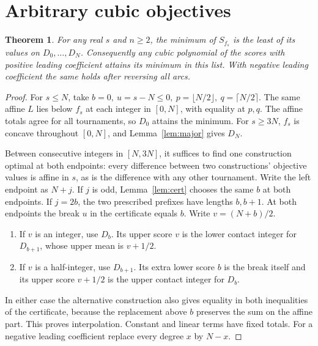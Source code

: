 \documentclass[11pt]{article}
\newtheorem{theorem}{Theorem}
\newcommand{\fl}[1]{\lfloor #1\rfloor}
\newcommand{\ce}[1]{\lceil #1\rceil}
\begin{document}
\newpage
\section*{Arbitrary cubic objectives}
\begin{theorem}
For any real \(s\) and \(n\ge2\), the minimum of \(S_{f_s}\) is the
least of its values on \(D_0,\ldots,D_N\). Consequently any cubic
polynomial of the scores with positive leading coefficient attains its
minimum in this list. With negative leading coefficient the same holds
after reversing all arcs.
\end{theorem}
\begin{proof}
For \(s\le N\), take \(b=0,\ u=s-N\le0,\ p=\fl{N/2},\
q=\ce{N/2}\). The same affine \(L\) lies below \(f_s\) at each integer
in \([0,N]\), with equality at \(p,q\). The affine totals agree for all
tournaments, so \(D_0\) attains the minimum. For \(s\ge3N\), \(f_s\) is
concave throughout \([0,N]\), and Lemma~\ref{lem:major} gives \(D_N\).

Between consecutive integers in \([N,3N]\), it suffices to find one
construction optimal at both endpoints: every difference between two
constructions' objective values is affine in \(s\), as is the difference
with any other tournament. Write the left endpoint as \(N+j\). If \(j\)
is odd, Lemma~\ref{lem:cert} chooses the same \(b\) at both endpoints.
If \(j=2b\), the two prescribed prefixes have lengths \(b,b+1\).
At both endpoints the break \(u\) in the certificate equals \(b\).
Write \(v=(N+b)/2\).
\begin{enumerate}
\item If \(v\) is an integer, use \(D_b\). Its upper score \(v\) is the
lower contact integer for \(D_{b+1}\), whose upper mean is \(v+1/2\).
\item If \(v\) is a half-integer, use \(D_{b+1}\). Its extra lower
score \(b\) is the break itself and its upper score \(v+1/2\) is the
upper contact integer for \(D_b\).
\end{enumerate}
In either case the alternative construction also gives equality in both
inequalities of the certificate, because the replacement above \(b\)
preserves the sum on the affine part. This proves interpolation.
Constant and linear terms have fixed totals. For a negative leading
coefficient replace every degree \(x\) by \(N-x\).
\end{proof}
\end{document}

